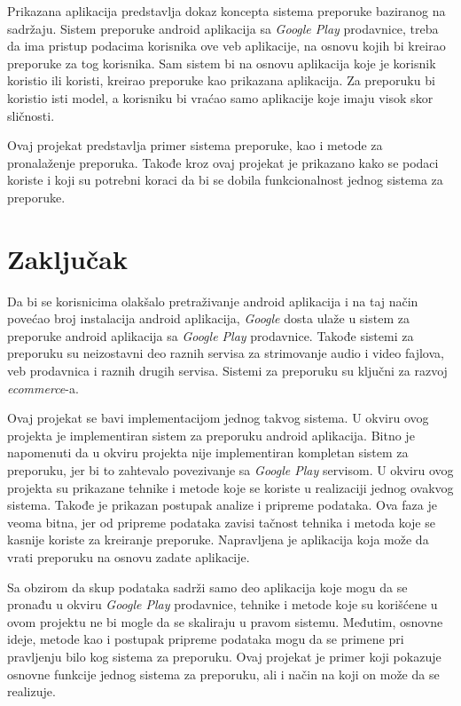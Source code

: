 \documentclass[a4paper,12pt,titlepage]{article}
\begin{document}
Prikazana aplikacija predstavlja dokaz koncepta sistema preporuke baziranog na sadržaju. Sistem preporuke android aplikacija sa \emph{Google Play} prodavnice, treba da ima pristup podacima korisnika ove veb aplikacije, na osnovu kojih bi kreirao preporuke za tog korisnika. Sam sistem bi na osnovu aplikacija koje je korisnik koristio ili koristi, kreirao preporuke kao prikazana aplikacija. Za preporuku bi koristio isti model, a korisniku bi vraćao samo aplikacije koje imaju visok skor sličnosti.

Ovaj projekat predstavlja primer sistema preporuke, kao i metode za pronalaženje preporuka. Takođe kroz ovaj projekat je prikazano kako se podaci koriste i koji su potrebni koraci da bi se dobila funkcionalnost jednog sistema za preporuke.



\section{Zaključak}%

Da bi se korisnicima olakšalo pretraživanje android aplikacija i na taj način povećao broj instalacija android aplikacija, \emph{Google} dosta ulaže u sistem za preporuke android aplikacija sa \emph{Google Play} prodavnice. Takođe sistemi za preporuku su neizostavni deo raznih servisa za strimovanje audio i video fajlova, veb prodavnica i raznih drugih servisa. Sistemi za preporuku su ključni za razvoj \emph{ecommerce}-a. 

Ovaj projekat se bavi implementacijom jednog takvog sistema. U okviru ovog projekta je implementiran sistem za preporuku android aplikacija. Bitno je napomenuti da u okviru projekta nije implementiran kompletan sistem za preporuku, jer bi to zahtevalo povezivanje sa \emph{Google Play} servisom. U okviru ovog projekta su prikazane tehnike i metode koje se koriste u realizaciji jednog ovakvog sistema. Takođe je prikazan postupak analize i pripreme podataka. Ova faza je veoma bitna, jer od pripreme podataka zavisi tačnost tehnika i metoda koje se kasnije koriste za kreiranje preporuke. Napravljena je aplikacija koja može da vrati preporuku na osnovu zadate aplikacije.

Sa obzirom da skup podataka sadrži samo deo aplikacija koje mogu da se pronađu u okviru \emph{Google Play} prodavnice, tehnike i metode koje su korišćene u ovom projektu ne bi mogle da se skaliraju u pravom sistemu. Međutim, osnovne ideje, metode kao i postupak pripreme podataka mogu da se primene pri pravljenju bilo kog sistema za preporuku. Ovaj projekat je primer koji pokazuje osnovne funkcije jednog sistema za preporuku, ali i način na koji on može da se realizuje. 
\end{document}
